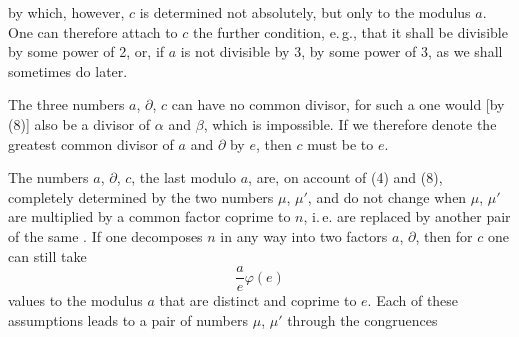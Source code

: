 
by which, however, $c$ is determined not absolutely, but only to the modulus
$a$. One can therefore attach to $c$ the further condition, e.\,g., that it
shall be divisible by some power of 2, or, if $a$ is not divisible by 3, by
some power of 3, as we shall sometimes do later.

The three numbers $a$, $\partial$, $c$ can have no common divisor,
for such a one would [by (8)] also be a divisor of $\alpha$ and $\beta$, which
is impossible. If we therefore denote the greatest common divisor of $a$
and $\partial$ by $e$, then $c$ must be  to $e$.

The numbers $a$, $\partial$, $c$, the last modulo $a$, are, on account of (4)
and (8), completely determined by the two numbers $\mu$, $\mu'$, and do not
change when $\mu$, $\mu'$ are multiplied by a common factor coprime to $n$,
i.\,e. are replaced by another pair of the same .
If one decomposes $n$ in any way into two factors $a$, $\partial$, then for
$c$ one can still take
\[
\frac{a}{e}\varphi(e)
\]
values to the modulus $a$ that are distinct and coprime to $e$. Each
of these assumptions leads to a pair of numbers $\mu$, $\mu'$ through the
congruences
